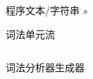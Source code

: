 
\begin{frame}{}
  \begin{center}
     程序文本/字符串 $s$ 

    \vspace{0.50cm}

    \vspace{0.30cm}
     词法单元流
  \end{center}
\end{frame}

\begin{frame}{}
  \begin{columns}
      \begin{center}
        词法分析器生成器
      \end{center}
  \end{columns}
\end{frame}
